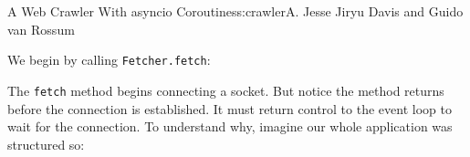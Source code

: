 \begin{aosachapter}{A Web Crawler With asyncio Coroutines}{s:crawler}{A. Jesse Jiryu Davis and Guido van Rossum}
\begin{Shaded}
\begin{Highlighting}[]
 
     \NormalTok{(}
          
\end{Highlighting}
\end{Shaded}

We begin by calling \texttt{Fetcher.fetch}:

\begin{Shaded}
\begin{Highlighting}[]
     \NormalTok{):}
        \NormalTok{)}
        \NormalTok{:}
            \NormalTok{((}\NormalTok{, }\NormalTok{))}
         \NormalTok{:}
            
\end{Highlighting}
\end{Shaded}

The \texttt{fetch} method begins connecting a socket. But notice the
method returns before the connection is established. It must return
control to the event loop to wait for the connection. To understand why,
imagine our whole application was structured so:

\begin{Shaded}
\begin{Highlighting}[]
\NormalTok{)}

 \NormalTok{:}
     
\end{Highlighting}
\end{Shaded}


\end{aosachapter}
